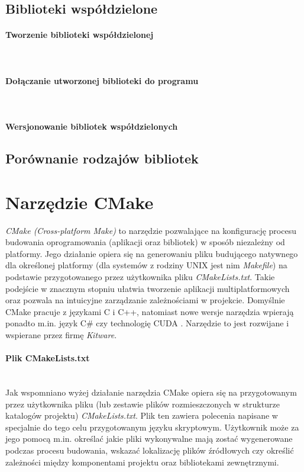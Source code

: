 \subsection{Biblioteki współdzielone}



\paragraph*{Tworzenie biblioteki współdzielonej}\mbox{}\\
\paragraph*{Dołączanie utworzonej biblioteki do programu}\mbox{}\\
\paragraph*{Wersjonowanie bibliotek współdzielonych}

\subsection{Porównanie rodzajów bibliotek}

\section{Narzędzie CMake}

\textit{CMake (Cross-platform Make)} to narzędzie pozwalające na konfigurację procesu budowania oprogramowania (aplikacji oraz bibliotek) w sposób niezależny od platformy. Jego działanie opiera się na generowaniu pliku budującego natywnego dla określonej platformy \cite{CMakeIntro} (dla systemów z rodziny UNIX jest nim \textit{Makefile}) na podstawie przygotowanego przez użytkownika pliku \textit{CMakeLists.txt}. Takie podejście w znacznym stopniu ułatwia tworzenie aplikacji multiplatformowych oraz pozwala na intuicyjne zarządzanie zależnościami w projekcie. Domyślnie CMake pracuje z językami C i C++, natomiast nowe wersje narzędzia wpierają ponadto m.in. język C\# czy technologię CUDA \cite{CMakeSupport}. Narzędzie to jest rozwijane i wspierane przez firmę \textit{Kitware}.\par

\paragraph*{Plik CMakeLists.txt}\mbox{} \\
Jak wspomniano wyżej działanie narzędzia CMake opiera się na przygotowanym przez użytkownika pliku (lub zestawie plików rozmieszczonych w strukturze katalogów projektu) \textit{CMakeLists.txt}. Plik ten zawiera polecenia napisane w specjalnie do tego celu przygotowanym języku skryptowym. Użytkownik może za jego pomocą  m.in. określać jakie pliki wykonywalne mają zostać wygenerowane podczas procesu budowania, wskazać lokalizację plików źródłowych czy określić zależności między komponentami projektu oraz bibliotekami zewnętrznymi. \par

